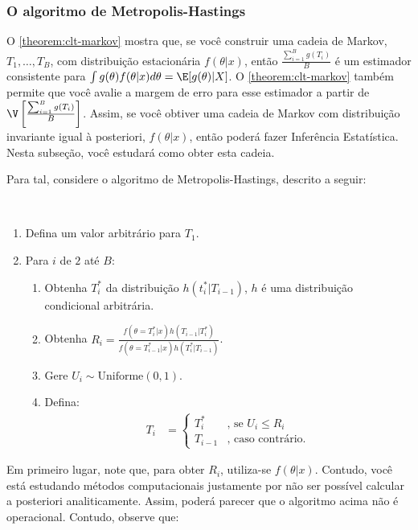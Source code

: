 \subsubsection{O algoritmo de Metropolis-Hastings}
\label{subsec:mh}

O \cref{theorem:clt-markov} mostra que,
se você construir uma cadeia de Markov, $T_{1},\ldots,T_{B}$,
com distribuição estacionária $f(\theta|x)$,
então $\frac{\sum_{i=1}^{B}{g(T_{i})}}{B}$ é um
estimador consistente para
$\int{g(\theta)f(\theta|x)d\theta} = \E[g(\theta)|X]$.
O \cref{theorem:clt-markov} também permite que 
você avalie a margem de erro para
esse estimador a partir
de $\V\left[\frac{\sum_{i=1}^{B}{g(T_{i})}}{B}\right]$.
Assim, se você obtiver uma cadeia de Markov com 
distribuição invariante igual à posteriori,
$f(\theta|x)$, então
poderá fazer Inferência Estatística.
Nesta subseção, você estudará como obter esta cadeia.

Para tal, considere o algoritmo de
Metropolis-Hastings, descrito a seguir:

\begin{algorithm2} \
 \label{alg:m-h}
 \begin{enumerate}
  \item Defina um valor arbitrário para $T_{1}$.
  \item Para $i$ de $2$ até $B$:
  \begin{enumerate}[label=\alph*.]
   \item Obtenha $T_{i}^{*}$ da distribuição
   $h(t_{i}^*|T_{i-1})$,
   $h$ é uma distribuição condicional arbitrária.
   \item Obtenha $R_i=\frac{f(\theta=T_i^{*}|x)h(T_{i-1}|T_{i}^*)}{f(\theta=T_{i-1}^{*}|x)h(T_{i}^*|T_{i-1})}$.
   \item Gere $U_i \sim \text{Uniforme}(0,1)$.
   \item Defina:
   \begin{align*}
    T_{i} &=
    \begin{cases}
     T_{i}^{*} & \text{, se } U_i \leq R_i \\
     T_{i-1} & \text{, caso contrário.}
    \end{cases}
   \end{align*}
  \end{enumerate}
 \end{enumerate}
\end{algorithm2}

Em primeiro lugar, note que, para obter $R_i$,
utiliza-se $f(\theta|x)$. Contudo, você está estudando
métodos computacionais justamente por não ser
possível calcular a posteriori analiticamente.
Assim, poderá parecer que o algoritmo acima não é
operacional. Contudo, observe que:

